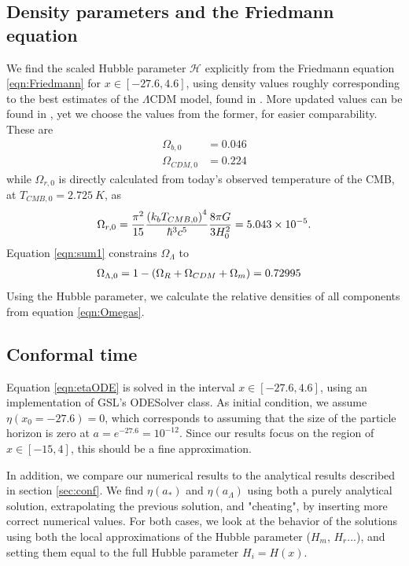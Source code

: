 \documentclass[10pt, a4paper]{article}
\begin{document}
\subsection{Density parameters and the Friedmann equation}
We find the scaled Hubble parameter $\mathcal{H}$ explicitly from the Friedmann equation \ref{eqn:Friedmann} for $x \in [-27.6, 4.6]$, using density values roughly corresponding to the best estimates of the $\Lambda$CDM model, found in \cite{callin2006}. More updated values can be found in \cite{Planck2015}, yet we choose the values from the former, for easier comparability. These are
\begin{align*}
    \Omega_{b,0} &= 0.046 \\
    \Omega_{CDM,0} &= 0.224
\end{align*}
while $\Omega_{r,0}$ is directly calculated from today's observed temperature of the CMB, at $T_{CMB,0} = \SI{2.725}{K}$, as
\begin{align*}
    \Omega_{r,0} = \frac{\pi^2}{15}\frac{\qty(k_bT_{CMB,0})^4}{\hbar^3c^5}\frac{8\pi G}{3H_0^2} = 5.043 \times 10^{-5}.
\end{align*}
Equation \ref{eqn:sum1} constrains $\Omega_\Lambda$ to
\begin{align*}
    \Omega_{\Lambda,0} &= 1 - \qty(\Omega_R + \Omega_{CDM} + \Omega_m) = 0.72995
\end{align*}
Using the Hubble parameter, we calculate the relative densities of all components from equation \ref{eqn:Omegas}.


\subsection{Conformal time}
Equation \ref{eqn:etaODE} is solved in the interval $x \in [-27.6, 4.6]$, using an implementation of GSL's ODESolver class. As initial condition, we assume $\eta(x_0 = -27.6) = 0$, which corresponds to assuming that the size of the particle horizon is zero at $a=e^{-27.6} = 10^{-12}$. Since our results focus on the region of $x \in [-15, 4]$, this should be a fine approximation.

In addition, we compare our numerical results to the analytical results described in section \ref{sec:conf}. We find $\eta(a_*)$ and $\eta(a_\Lambda)$ using both a purely analytical solution, extrapolating the previous solution, and "cheating", by inserting more correct numerical values. For both cases, we look at the behavior of the solutions using both the local approximations of the Hubble parameter ($H_m$, $H_r$...), and setting them equal to the full Hubble parameter $H_i = H(x)$.
\end{document}
